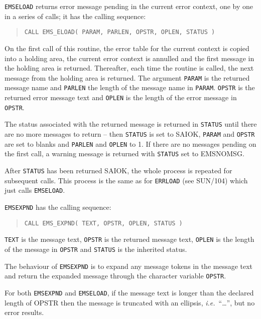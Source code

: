 \documentclass[twoside,11pt]{article}
\newcommand{\latex}[1]{#1}
\newcommand{\xref}[3]{#1}
\renewcommand{\_}{\texttt{\symbol{95}}}
\begin{document}
\texttt{EMS\_ELOAD} returns error message pending in the current error context,
one by one in a series of calls; it has the calling sequence:
\begin{quote}
\begin{verbatim}
CALL EMS_ELOAD( PARAM, PARLEN, OPSTR, OPLEN, STATUS )
\end{verbatim}
\end{quote}
On the first call of this routine, the error table for the current 
context is copied into a holding area, the current error context
is annulled and the first message in the holding area is returned.
Thereafter, each time the routine is called, the next message from 
the holding area is returned.
The argument \texttt{PARAM} is the returned message name and \texttt{PARLEN}
the length of the message name in \texttt{PARAM}.
\texttt{OPSTR} is the returned error message text and \texttt{OPLEN} is the
length of the error message in \texttt{OPSTR}.

The status associated with the returned message is returned in \texttt{STATUS}
until there are no more messages to return -- then \texttt{STATUS} is set to
SAI\_\_OK, \texttt{PARAM} and \texttt{OPSTR} are set to blanks and
\texttt{PARLEN} and \texttt{OPLEN} to 1.
If there are no messages pending on the first call, a warning message 
is returned with \texttt{STATUS} set to EMS\_\_NOMSG.

After \texttt{STATUS} has been returned SAI\_\_OK, the whole process is
repeated for subsequent calls.
This process is the same as for 
\xref{\texttt{ERR\_LOAD}}{sun104}{ERR_LOAD}\latex{ (see SUN/104)} 
which just calls \texttt{EMS\_ELOAD}.

\texttt{EMS\_EXPND} has the calling sequence:
\begin{quote}
\begin{verbatim}
CALL EMS_EXPND( TEXT, OPSTR, OPLEN, STATUS )
\end{verbatim}
\end{quote}
\texttt{TEXT} is the message text, \texttt{OPSTR} is the returned message text,
\texttt{OPLEN} is the length of the message in \texttt{OPSTR} and
\texttt{STATUS} is the inherited status. 

The behaviour of \texttt{EMS\_EXPND} is to expand any message tokens in the
message text and return the expanded message through the character variable
\texttt{OPSTR}.

For both \texttt{EMS\_EXPND} and \texttt{EMS\_ELOAD}, if the message text is
longer than the declared length of OPSTR then the message is truncated with an 
ellipsis, \textit{i.e.}\ ``\ldots'', but no error results.
\end{document}
